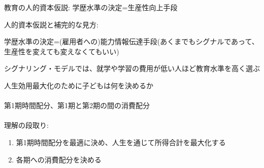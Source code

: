 \begin{frame}{}
教育の人的資本仮説: 学歴水準の決定=生産性向上手段
\begin{dinglist}{45}
\vspace{1.0ex}\setlength{\itemsep}{1.0ex}\setlength{\baselineskip}{12pt}
\pause
\item	人的資本仮説と補完的な見方: 
	\begin{description}
	\vspace{1.0ex}\setlength{\itemsep}{1.0ex}\setlength{\baselineskip}{12pt}
	\item[シグナリング仮説]	学歴水準の決定=(雇用者への)能力情報伝達手段(あくまでもシグナルであって、生産性を変えても変えなくてもいい)
	\end{description}
\pause
\item	シグナリング・モデルでは、就学や学習の費用が低い人ほど教育水準を高く選ぶ
\end{dinglist}
\vspace{2ex}
\pause
人生効用最大化のために子どもは何を決めるか\\~\\
\pause
第1期時間配分、第1期と第2期の間の消費配分\\~\\
\pause
理解の段取り: 
\begin{enumerate}
\vspace{1.0ex}\setlength{\itemsep}{1.0ex}\setlength{\baselineskip}{12pt}
\pause
\item	第1期時間配分を最適に決め、人生を通じて所得合計を最大化する
\pause
\item	各期への消費配分を決める
\end{enumerate}
\end{frame}


